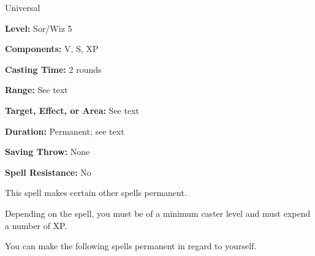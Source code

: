
Universal

\textbf{Level:} Sor/Wiz 5

\textbf{Components:} V, S, XP

\textbf{Casting Time:} 2 rounds

\textbf{Range:} See text

\textbf{Target, Effect, or Area:} See text

\textbf{Duration:} Permanent; see text

\textbf{Saving Throw:} None

\textbf{Spell Resistance:} No

This spell makes certain other spells permanent.

Depending on the spell, you must be of a minimum caster level and must expend a 
number of XP.

You can make the following spells permanent in regard to yourself.

